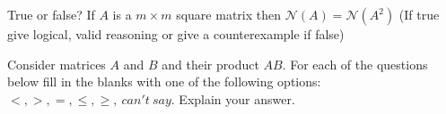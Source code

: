 \documentclass[solution,addpoints,12pt]{exam}
\begin{document}
\begin{questions}

\question[1] True or false? If $A$ is a $m\times m$ square matrix then $\mathcal{N}(A) = \mathcal{N}(A^2)$ (If true give logical, valid reasoning or give a counterexample if false)
\begin{solution}

\end{solution}

\question[2] Consider matrices $A$ and $B$ and their product $AB$. For each of the questions below fill in the blanks with one of the following options: $<,>,=, \leq,\geq,~can't~say$. Explain your answer.
\end{questions}
\end{document}
